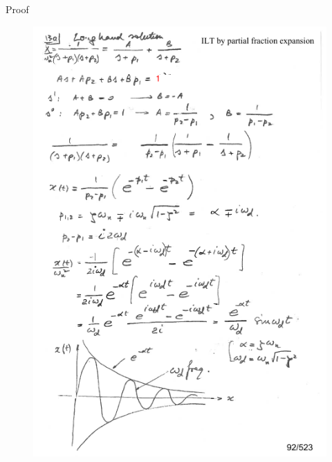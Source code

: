 \documentclass[12pt,letter]{article}
\numberwithin{ex}{section} %
\numberwithin{re}{section} %
\newcommand{\gr}[1]{\textcolor[rgb]{0.00,0.50,0.00}{#1}}
\numberwithin{equation}{section}	%
\begin{document}
\begin{mdframed}[middlelinewidth=0.5mm]
	\begin{center}
		\gr{Proof}
	\end{center}
	
	\begin{figure}[H]
		\centering
		\includegraphics[width=5.5in]{../figures/x_t_time_response_2nd_order_impulse_proof_1}
	\end{figure}
	\begin{figure}[H]
		\centering

\end{figure}
\end{mdframed}
\end{document}
